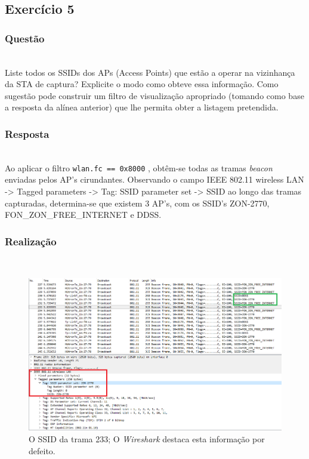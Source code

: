 \documentclass{llncs}
\begin{document}
\clearpage
\subsection{Exercício 5}
\subsubsection{Questão}\rule[-10pt]{0pt}{10pt}\\

Liste todos os SSIDs dos APs (Access Points) que estão a operar na vizinhança da STA de captura? Explicite o modo como obteve essa informação. Como sugestão pode construir um filtro de visualização apropriado (tomando como base a resposta da alínea anterior) que lhe permita obter a listagem pretendida.

\subsubsection{Resposta}\rule[-10pt]{0pt}{10pt}\\

Ao aplicar o filtro \texttt{wlan.fc == 0x8000} , obtêm-se todas as tramas \textit{beacon} enviadas pelos AP's cirundantes. Observando o campo IEEE 802.11 wireless LAN -> Tagged parameters -> Tag: SSID parameter set -> SSID ao longo das tramas capturadas, determina-se que existem 3 AP's, com os SSID's ZON-2770, FON\_ZON\_FREE\_INTERNET e DDSS.

\subsubsection{Realização}\rule[-10pt]{0pt}{10pt}\\

\begin{figure}
  \begin{center}
  \includegraphics[scale=0.40]{imagens/SSID.png} 
  \end{center}
  \caption{O SSID da trama 233; O \textit{Wireshark} destaca esta informação por defeito.}
  \label{fig:ssid_field}
\end{figure}
\end{document}
